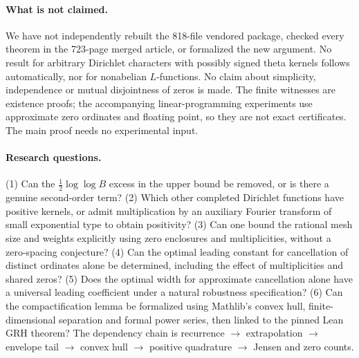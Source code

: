 \documentclass[11pt]{article}
\theoremstyle{remark}\newtheorem{remark}[theorem]{Remark}
\begin{document}
\paragraph{What is not claimed.} We have not independently rebuilt the 818-file vendored package, checked every theorem in the 723-page merged article, or formalized the new argument. No result for arbitrary Dirichlet characters with possibly signed theta kernels follows automatically, nor for nonabelian $L$-functions. No claim about simplicity, independence or mutual disjointness of zeros is made. The finite witnesses are existence proofs; the accompanying linear-programming experiments use approximate zero ordinates and floating point, so they are not exact certificates. The main proof needs no experimental input.

\paragraph{Research questions.} (1) Can the $\frac12\log\log B$ excess in the upper bound be removed, or is there a genuine second-order term? (2) Which other completed Dirichlet functions have positive kernels, or admit multiplication by an auxiliary Fourier transform of small exponential type to obtain positivity? (3) Can one bound the rational mesh size and weights explicitly using zero enclosures and multiplicities, without a zero-spacing conjecture? (4) Can the optimal leading constant for cancellation of distinct ordinates alone be determined, including the effect of multiplicities and shared zeros? (5) Does the optimal width for approximate cancellation alone have a universal leading coefficient under a natural robustness specification? (6) Can the compactification lemma be formalized using Mathlib's convex hull, finite-dimensional separation and formal power series, then linked to the pinned Lean GRH theorem? The dependency chain is recurrence $\to$ extrapolation $\to$ envelope tail $\to$ convex hull $\to$ positive quadrature $\to$ Jensen and zero counts.
\end{document}
